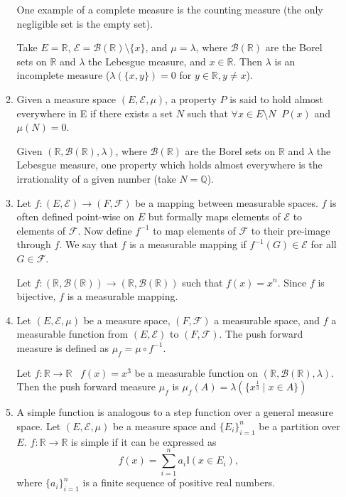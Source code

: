 \documentclass[pstricks, 11pt,a4paper]{article}
\theoremstyle{theorem}
\begin{document}
\begin{enumerate}
\begin{enumerate}
                One example of a complete measure is the counting measure (the only negligible set is the empty set).

                Take $E=\mathbb{R}$, $\mathcal{E}=\mathcal{B}(\mathbb{R})\setminus\{x\}$, and $\mu=\lambda$, where $\mathcal{B}(\mathbb{R})$ are the Borel sets on $\mathbb{R}$ and $\lambda$ the Lebesgue measure, and $x\in\mathbb{R}$. Then $\lambda$ is an incomplete measure ($\lambda(\{x, y\})=0$ for $y \in \mathbb{R}, y\neq x$).
          \item Given a measure space $(E, \mathcal{E}, \mu)$, a property $P$ is said to hold almost everywhere in E if there exists a set $N$ such that $\forall x \in E\setminus N \;\; P(x)$ and $\mu(N) = 0$.

                Given $(\mathbb{R}, \mathcal{B}(\mathbb{R}), \lambda)$, where $\mathcal{B}(\mathbb{R})$ are the Borel sets on $\mathbb{R}$ and $\lambda$ the Lebesgue measure, one property which holds almost everywhere is the irrationality of a given number (take $N=\mathbb{Q}$).
          \item Let $f:(E, \mathcal{E})\rightarrow(F, \mathcal{F})$ be a mapping between measurable spaces. $f$ is often defined point-wise on $E$ but formally maps elements of $\mathcal{E}$ to elements of $\mathcal{F}$. Now define $f^{-1}$ to map elements of $\mathcal{F}$ to their pre-image through $f$. We say that $f$ is a measurable mapping if $f^{-1}(G) \in \mathcal{E}$ for all $G \in \mathcal{F}$.

                Let $f:(\mathbb{R}, \mathcal{B}(\mathbb{R}))\rightarrow(\mathbb{R}, \mathcal{B}(\mathbb{R}))$ such that $f(x)=x^{n}$. Since $f$ is bijective, $f$ is a measurable mapping.
          \item Let $(E, \mathcal{E}, \mu)$ be a measure space, $(F, \mathcal{F})$ a measurable space, and $f$ a measurable function from $(E, \mathcal{E})$ to $(F, \mathcal{F})$. The push forward measure is defined as
                \(
                \mu_{f} = \mu \circ f^{-1}
                \).

                Let $f: \mathbb{R}\rightarrow\mathbb{R} \;\;\;f(x) = x^{3}$ be a measurable function on $(\mathbb{R}, \mathcal{B}(\mathbb{R}), \lambda)$. Then the push forward measure $\mu_{f}$ is $\mu_{f}(A)=\lambda(\{x^{\frac{1}{3}}\mid x \in A\})$
          \item A simple function is analogous to a step function over a general measure space.
                Let $(E, \mathcal{E}, \mu)$ be a measure space and $\{E_{i}\}_{i=1}^{n}$ be a partition over $E$. $f:\mathbb{R}\rightarrow\mathbb{R}$ is simple if it can be expressed as
                \[
                f(x) = \sum_{i=1}^{n} a_{i}\mathbb{I}\left(x\in E_{i}\right),
                \]
                where $\{a_{i}\}_{i=1}^{n}$ is a finite sequence of positive real numbers.


\end{enumerate}
\end{enumerate}
\end{document}
